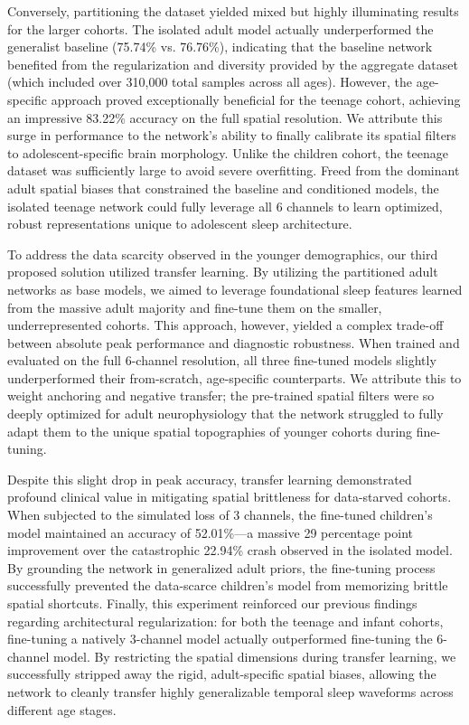 Conversely, partitioning the dataset yielded mixed but highly illuminating 
results for the larger cohorts. The isolated adult model actually underperformed 
the generalist baseline (75.74\% vs. 76.76\%), indicating that the baseline network
benefited from the regularization and diversity provided by the aggregate dataset
(which included over 310,000 total samples across all ages). However, the
age-specific approach proved exceptionally beneficial for the teenage cohort,
achieving an impressive 83.22\% accuracy on the full spatial resolution. We
attribute this surge in performance to the network's ability to finally calibrate
its spatial filters to adolescent-specific brain morphology. Unlike the children
cohort, the teenage dataset was sufficiently large to avoid severe overfitting.
Freed from the dominant adult spatial biases that constrained the baseline and
conditioned models, the isolated teenage network could fully leverage all 6
channels to learn optimized, robust representations unique to adolescent sleep
architecture.

To address the data scarcity observed in the younger demographics, our third
proposed solution utilized transfer learning. By utilizing the partitioned adult
networks as base models, we aimed to leverage foundational sleep features learned
from the massive adult majority and fine-tune them on the smaller,
underrepresented cohorts. This approach, however, yielded a complex trade-off
between absolute peak performance and diagnostic robustness. When trained and
evaluated on the full 6-channel resolution, all three fine-tuned models slightly
underperformed their from-scratch, age-specific counterparts. We attribute this
to weight anchoring and negative transfer; the pre-trained spatial filters were
so deeply optimized for adult neurophysiology that the network struggled to fully
adapt them to the unique spatial topographies of younger cohorts during fine-tuning.

Despite this slight drop in peak accuracy, transfer learning demonstrated
profound clinical value in mitigating spatial brittleness for data-starved
cohorts. When subjected to the simulated loss of 3 channels, the fine-tuned
children's model maintained an accuracy of 52.01\%—a massive 29 percentage point 
improvement over the catastrophic 22.94\% crash observed in the isolated model. 
By grounding the network in generalized adult priors, the fine-tuning process
successfully prevented the data-scarce children's model from memorizing
brittle spatial shortcuts. Finally, this experiment reinforced our previous findings
regarding architectural regularization: for both the teenage and infant cohorts,
fine-tuning a natively 3-channel model actually outperformed fine-tuning the
6-channel model. By restricting the spatial dimensions during transfer learning,
we successfully stripped away the rigid, adult-specific spatial biases, allowing
the network to cleanly transfer highly generalizable temporal sleep waveforms
across different age stages.

